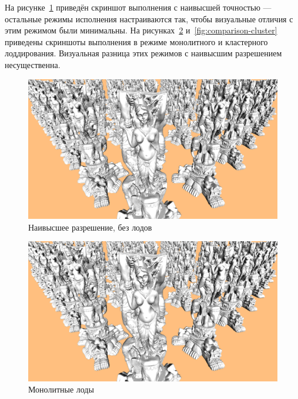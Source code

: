 На рисунке~\ref{fig:comparison-0} приведён скриншот выполнения с наивысшей точностью --- остальные режимы исполнения настраиваются так, чтобы визуальные отличия с этим режимом были минимальны.
На рисунках~\ref{fig:comparison-mono} и~\ref{fig:comparison-cluster} приведены скриншоты выполнения в режиме монолитного и кластерного лоддирования.
Визуальная разница этих режимов с наивысшим разрешением несущественна.

\begin{figure}[H]
    \includegraphics[width=\textwidth]{pics/comparison-0.png}
    \caption{Наивысшее разрешение, без лодов}
    \label{fig:comparison-0}
\end{figure}

\begin{figure}[H]
    \includegraphics[width=\textwidth]{pics/comparison-mono.png}
    \caption{Монолитные лоды}
    \label{fig:comparison-mono}
\end{figure}

